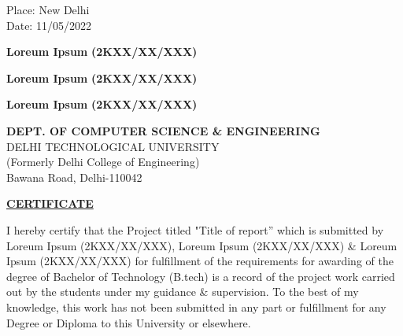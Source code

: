 \documentclass[12pt,a4paper]{report}
\begin{document}
\noindent \begin{minipage}{4cm}
\begin{flushleft}
\vspace{5 cm}
                         
Place: New Delhi\\
Date: 11/05/2022\\

\end{flushleft} 
\end{minipage}
\hfill
\begin{minipage}{12cm}
\begin{flushright}                                      
\vspace{5 cm}
\begin{multicols}{3}
\vspace{1cm}
\textbf{Loreum Ipsum}
\vspace{0.2cm}
\textbf{(2KXX/XX/XXX)}\\
\vspace{0.2cm}

\vspace{1cm}
\textbf{Loreum Ipsum}
\vspace{0.2cm}
\textbf{(2KXX/XX/XXX)}\\
\vspace{0.2cm}

\vspace{1cm}
\textbf{Loreum Ipsum}
\vspace{0.2cm}
\textbf{(2KXX/XX/XXX)}\\
\vspace{0.2cm}
\end{multicols}


\end{flushright} 
\end{minipage}


\newpage


\begin{center}
\textbf{DEPT. OF COMPUTER SCIENCE \& ENGINEERING}\\

DELHI TECHNOLOGICAL UNIVERSITY \\
(Formerly Delhi College of Engineering) \\
Bawana Road, Delhi-110042\\
\end{center}

\vspace{2cm}
\begin{center}
 \textbf{\underline {CERTIFICATE}}
\end{center}
I hereby certify that the Project titled "Title of report” which is submitted by Loreum Ipsum (2KXX/XX/XXX), Loreum Ipsum (2KXX/XX/XXX) \& Loreum Ipsum (2KXX/XX/XXX) for fulfillment of the requirements for awarding of the degree of Bachelor of Technology (B.tech) is a record of the project work carried out by the students under my guidance \& supervision. To the best of my knowledge, this work has not been submitted in any part or fulfillment for any Degree or Diploma to this University or elsewhere.
\end{document}
